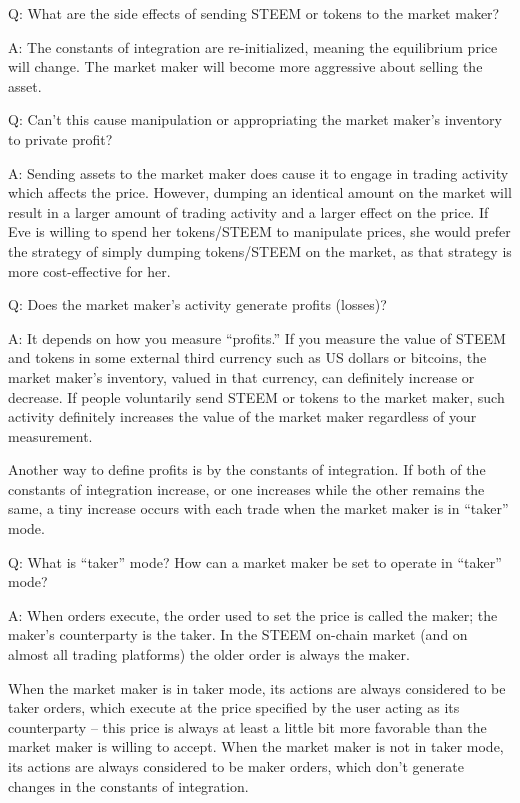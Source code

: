 \documentclass{article}
\begin{document}
Q:  What are the side effects of sending STEEM or tokens to the market maker?

A:  The constants of integration are re-initialized, meaning the equilibrium price will
change.  The market maker will become more aggressive about selling the asset.

Q:  Can't this cause manipulation or appropriating the market maker's inventory
to private profit?

A:  Sending assets to the market maker does cause it to engage in trading activity
which affects the price.  However, dumping an identical amount on the market will
result in a larger amount of trading activity and a larger effect on the price.  If
Eve is willing to spend her tokens/STEEM to manipulate prices, she would prefer
the strategy of simply dumping tokens/STEEM on the market, as that strategy is more
cost-effective for her.

Q:  Does the market maker's activity generate profits (losses)?

A:  It depends on how you measure ``profits.'' If you measure the value of STEEM
and tokens in some external third currency such as US dollars or bitcoins, the
market maker's inventory, valued in that currency, can definitely increase or
decrease.  If people voluntarily send STEEM or tokens to the market maker,
such activity definitely increases the value of the market maker regardless of
your measurement.

Another way to define profits is by the constants of integration.  If both
of the constants of integration increase, or one increases while the other
remains the same, a tiny increase occurs with each trade when the market
maker is in ``taker'' mode.

Q:  What is ``taker'' mode?  How can a market maker be set to operate
in ``taker'' mode?

A:  When orders execute, the order used to set the price is called the maker;
the maker's counterparty is the taker.  In the STEEM on-chain market (and on
almost all trading platforms) the older order is always the maker.

When the market maker is in taker mode, its actions are always considered to be
taker orders, which execute at the price specified by the user acting as its
counterparty -- this price is always at least a little bit more favorable than
the market maker is willing to accept.  When the market maker is not in taker
mode, its actions are always considered to be maker orders, which don't
generate changes in the constants of integration.
\end{document}
